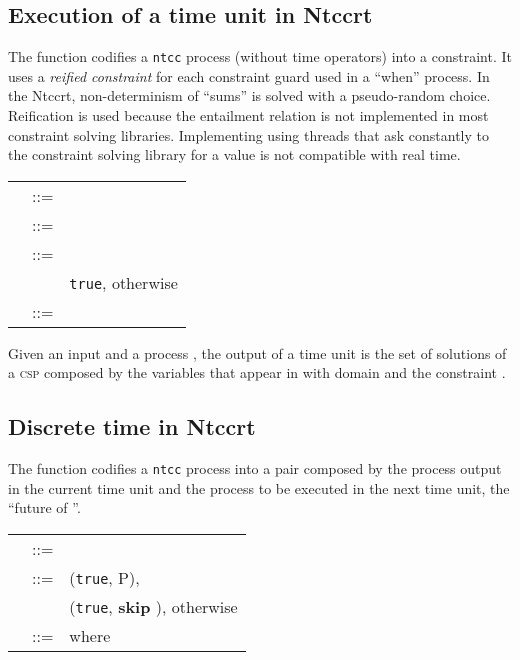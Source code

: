 \documentclass[english]{llncs}
\begin{document}
\subsection{Execution of a time unit in Ntccrt}

The function  codifies a \texttt{ntcc} process  (without time operators) into a constraint. It uses a \textit{reified constraint}  for each constraint guard  used in a
``when'' process. In the Ntccrt, non-determinism of ``sums'' is solved with a pseudo-random choice. Reification is used because the entailment relation  is not implemented in most constraint solving libraries. Implementing  using threads that ask constantly to the constraint solving library for a value is not compatible with real time. 

\begin{center}\begin{tabular}{l l l }
 &::= &\\

 &::= &\\


 &::= & \\
&&\texttt{true}, otherwise \\

 &::= &\\
\end{tabular}\end{center}

Given an input  and a process , the output of a time unit is the set of solutions of a \textsc{csp} composed by the variables that appear in  with domain  and the constraint .

\subsection{Discrete time in Ntccrt}
The function  codifies a \texttt{ntcc} process into 
a pair composed by the process output in the current time unit and the process to be executed in the next time unit, the ``future of ''.

\begin{center}\begin{tabular}{l l l}
 &::= &\\
 &::= &(\texttt{true}, P),  \\
                        &&(\texttt{true}, \textbf{skip} ), otherwise  \\
 &::= &  where \\
\end{tabular}\end{center} 
\end{document}
